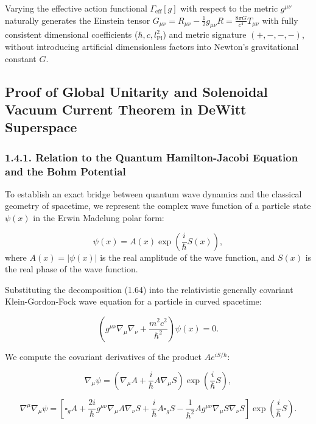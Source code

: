 \documentclass[11pt,a4paper]{article}
\theoremstyle{definition}
\begin{document}
Varying the effective action functional $\Gamma_{\text{eff}}[g]$ with respect to the metric $g^{\mu\nu}$ naturally generates the Einstein tensor $G_{\mu\nu} = R_{\mu\nu} - \frac{1}{2}g_{\mu\nu} R = \frac{8\pi G}{c^4} T_{\mu\nu}$ with fully consistent dimensional coefficients ($\hbar, c, l_{\text{Pl}}^2$) and metric signature $(+,-,-,-)$, without introducing artificial dimensionless factors into Newton's gravitational constant $G$.

\subsection{Proof of Global Unitarity and Solenoidal Vacuum Current Theorem in DeWitt Superspace}\label{sec:1.4}

\subsubsection{1.4.1. Relation to the Quantum Hamilton-Jacobi Equation and the Bohm Potential}\label{sec:1.4.1}

To establish an exact bridge between quantum wave dynamics and the classical geometry of spacetime, we represent the complex wave function of a particle state $\psi(x)$ in the Erwin Madelung polar form:

\begin{equation}\label{eq:1.64}\tag{1.64}
\psi(x) = A(x) \exp\left( \frac{i}{\hbar} S(x) \right),
\end{equation}
where $A(x) = |\psi(x)|$ is the real amplitude of the wave function, and $S(x)$ is the real phase of the wave function.

Substituting the decomposition (1.64) into the relativistic generally covariant Klein-Gordon-Fock wave equation for a particle in curved spacetime:

\begin{equation}\label{eq:1.65}\tag{1.65}
\left( g^{\mu\nu}\nabla_\mu \nabla_\nu + \frac{m^2 c^2}{\hbar^2} \right) \psi(x) = 0.
\end{equation}

We compute the covariant derivatives of the product $A e^{i S/\hbar}$:

\begin{equation}\label{eq:1.66}\tag{1.66}
\nabla_\mu \psi = \left( \nabla_\mu A + \frac{i}{\hbar} A \nabla_\mu S \right) \exp\left( \frac{i}{\hbar} S \right),
\end{equation}

\begin{equation}\label{eq:1.67}\tag{1.67}
\nabla^\mu \nabla_\mu \psi = \left[ \square_g A + \frac{2i}{\hbar} g^{\mu\nu}\nabla_\mu A \nabla_\nu S + \frac{i}{\hbar} A \square_g S - \frac{1}{\hbar^2} A g^{\mu\nu}\nabla_\mu S \nabla_\nu S \right] \exp\left( \frac{i}{\hbar} S \right).
\end{equation}
\end{document}
